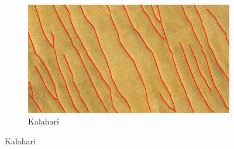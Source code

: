 \begin{figure}[htbp]
	\centering
	\begin{subfigure}[b]{0.3\textwidth}
		\centering
		\includegraphics[width=\textwidth]{figures/kalahari_with_gt}
		\caption{ Kalahari }
	

\end{subfigure}
\end{figure}
